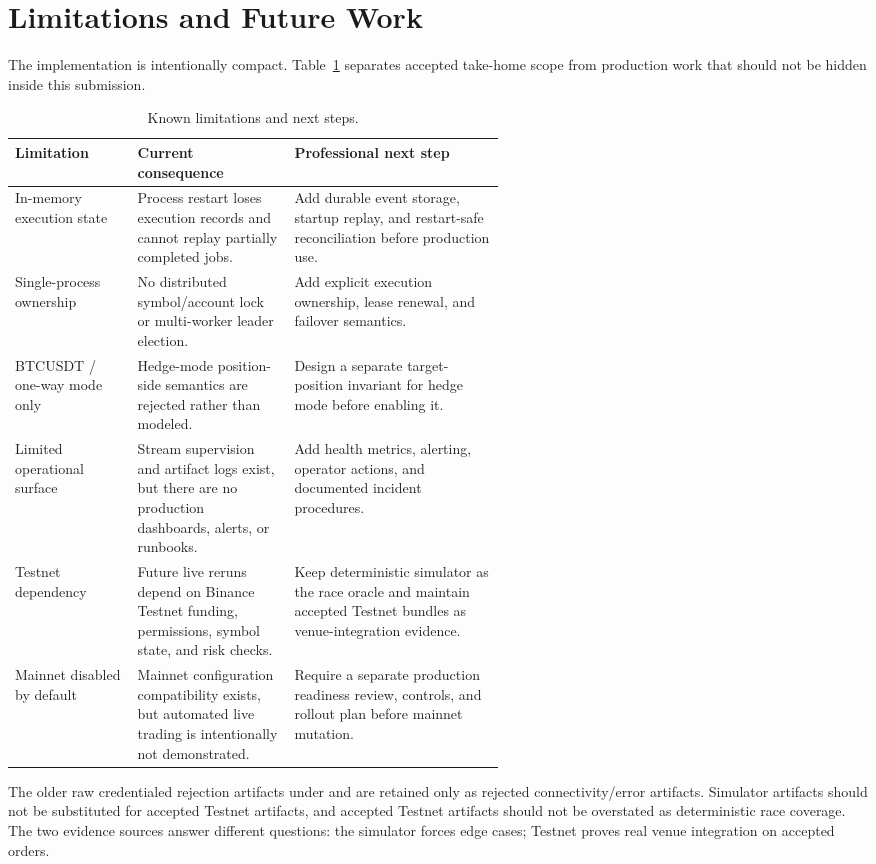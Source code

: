 \section{Limitations and Future Work}

The implementation is intentionally compact. Table~\ref{tab:limitations} separates accepted take-home scope from production work that should not be hidden inside this submission.

\begin{table}[htbp]
\caption{Known limitations and next steps.}
\label{tab:limitations}
\centering
\small
\begin{tabularx}{\linewidth}{>{\raggedright\arraybackslash}p{0.25\linewidth} >{\raggedright\arraybackslash}p{0.32\linewidth} X}
\toprule
Limitation & Current consequence & Professional next step \\
\midrule
In-memory execution state & Process restart loses execution records and cannot replay partially completed jobs. & Add durable event storage, startup replay, and restart-safe reconciliation before production use. \\
Single-process ownership & No distributed symbol/account lock or multi-worker leader election. & Add explicit execution ownership, lease renewal, and failover semantics. \\
BTCUSDT / one-way mode only & Hedge-mode position-side semantics are rejected rather than modeled. & Design a separate target-position invariant for hedge mode before enabling it. \\
Limited operational surface & Stream supervision and artifact logs exist, but there are no production dashboards, alerts, or runbooks. & Add health metrics, alerting, operator actions, and documented incident procedures. \\
Testnet dependency & Future live reruns depend on Binance Testnet funding, permissions, symbol state, and risk checks. & Keep deterministic simulator as the race oracle and maintain accepted Testnet bundles as venue-integration evidence. \\
Mainnet disabled by default & Mainnet configuration compatibility exists, but automated live trading is intentionally not demonstrated. & Require a separate production readiness review, controls, and rollout plan before mainnet mutation. \\
\bottomrule
\end{tabularx}
\end{table}

The older raw credentialed rejection artifacts under  and  are retained only as rejected connectivity/error artifacts. Simulator artifacts should not be substituted for accepted Testnet artifacts, and accepted Testnet artifacts should not be overstated as deterministic race coverage. The two evidence sources answer different questions: the simulator forces edge cases; Testnet proves real venue integration on accepted orders.
